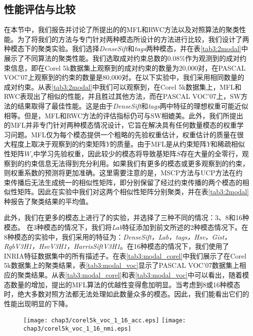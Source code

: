 \subsection{性能评估与比较}
在本节中，我们报告并讨论了所提出的的MFL和RWC方法以及对照算法的聚类性能。为了将我们的方法与专门针对两种模态所设计的方法进行比较，我们设计了两种模态下的聚类实验。我们选择\textit{DenseSift}和\textit{tags}两种模态，并在表\ref{tab3:2modal}中展示了不同算法的聚类性能。我们选取成对约束总数的$0.08\%$作为观测到的成对约束信息，即在Corel 5k数据集上观察到的成对约束的数量为20,000对，在PASCAL VOC'07上观察到的约束的数量是80,000对。在以下实验中，我们采用相同数量的成对约束。从表\ref{tab3:2modal}中我们可以观察到，在Corel 5k数据集上，MFL和RWC表现出了相似的性能，并且胜过其他方法，而在PASCAL VOC'07上，SW方法的结果取得了最佳性能。这是由于\textit{DenseSift}和\textit{tags}两中特征的理想权重可能近似相等。但是，MFL和RWC方法的评估指标仍可与SW相媲美。此外，我们所提出的MFL并非专门针对两种模态情况设计，它旨在解决具有任何数量模态的权重学习问题。MFL仅为每个模态提供一个粗略的先验权重估计，权重估计的质量在很大程度上取决于观察到的约束矩阵$ {Y} $的质量。由于MFL是从约束矩阵$ {Y} $和稀疏相似性矩阵${W}_s $中学习先验权重，因此较少的模态将导致基矩阵$ {S} $存在大量的全零行，观察到的约束信息无法得到充分利用。如果我们有更多的模态或更多观察到的约束，则权重系数的预测将更加准确。这里需要注意的是，MSCP方法与UCP方法在约束传播后无法生成统一的相似性矩阵，即分别保留了经过约束传播的两个模态的相似性矩阵。因此在实验中我们对这两个相似性矩阵分别聚类，并在表\ref{tab3:2modal}种报告了聚类结果的平均值。

此外，我们在更多的模态上进行了的实验，并选择了三种不同的情况：3、8和16种模态。 在3种模态的情况下，我们将\textit{Lab}特征添加到前文所述的2种模态情况下。在8种模态的实验中，我们采用的特征为：\textit{DenseSift，Lab，tags，Hsv，Gist，RgbV3H1，HsvV3H1，HarrisSiftV3H1}。在16种模态的情况下，我们使用了INRIA特征数据集中的所有描述子。在表\ref{tab3:modal_corel}中我们展示了在Corel 5k数据集上的聚类结果，表\ref{tab3:modal_voc}显示了PASCAL VOC'07数据集上相应的聚类结果。从表\ref{tab3:modal_corel}和表\ref{tab3:modal_voc}中可以看出，随着模态数量的增加，提出的MFL算法的优越性变得愈加明显。当考虑到8或16种模态时，绝大多数对照方法都无法处理如此数量众多的模态。因此，我们能看出它们的性能出现明显的下降。

\begin{figure}[t]
    \centering
    \texttt{[image: chap3/corel5k\_voc\_1\_16\_acc.eps]}
    \texttt{[image: chap3/corel5k\_voc\_1\_16\_nmi.eps]}
	\label{fig3:1_16}
\end{figure} 

